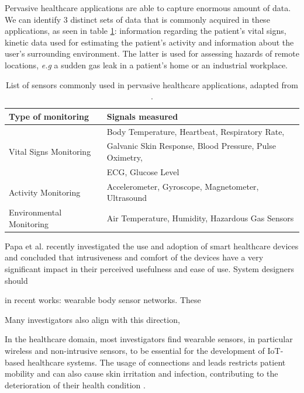 Pervasive healthcare applications are able to capture enormous amount of data. We can identify 3 distinct sets of data that is commonly acquired in these applications, as seen in table \ref{tab:layer1-sensors}: information regarding the patient's vital signs, kinetic data used for estimating the patient's activity and information about the user's surrounding environment. The latter is used for assessing hazards of remote locations, \textit{e.g} a sudden gas leak in a patient's home or an industrial workplace.

\begin{table}[H]
    \centering
    \begin{tabular}{l|l}
        \textbf{Type of monitoring} & \textbf{Signals measured} \\ 
        \hline
        \multirow{3}{*}{Vital Signs Monitoring} & Body Temperature, Heartbeat, Respiratory Rate, \\ & Galvanic Skin Response, Blood Pressure, Pulse Oximetry, \\ & \acf{ECG}, Glucose Level \\ \hline
        \multirow{1}{*}{Activity Monitoring} & Accelerometer, Gyroscope, Magnetometer, Ultrasound \\
        \hline
        \multirow{1}{*}{Environmental Monitoring} & Air Temperature, Humidity, Hazardous Gas Sensors
    \end{tabular}
    \caption[List of sensors commonly used in pervasive healthcare applications]{List of sensors commonly used in pervasive healthcare applications, adapted from \cite{MinhDang2019}.}
    \label{tab:layer1-sensors}
\end{table}

Papa et al. \cite{Papa2020} recently investigated the use and adoption of smart healthcare devices and concluded that intrusiveness and comfort of the devices have a very significant impact in their perceived usefulness and ease of use. System designers should 

in recent works: wearable body sensor networks. These  

Many investigators also align with this direction, 

In the healthcare domain, most investigators find wearable sensors, in particular wireless and non-intrusive sensors, to be essential for the development of IoT-based healthcare systems. The usage of connections and leads restricts patient mobility and can also cause skin irritation and infection, contributing to the deterioration of their health condition \cite{Darwish2011}. 


